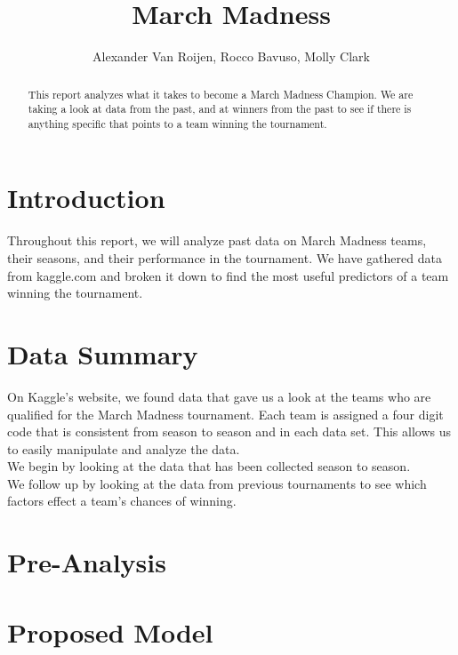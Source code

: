 \documentclass[]{scrartcl}
\title{March Madness}
\author{Alexander Van Roijen, Rocco Bavuso, Molly Clark}
\begin{document}
\maketitle

\begin{abstract}
This report analyzes what it takes to become a March Madness Champion. We are taking a look at data from the past, and at winners from the past to see if there is anything specific that points to a team winning the tournament.
\end{abstract}

\section*{Introduction}
Throughout this report, we will analyze past data on March Madness teams, their seasons, and their performance in the tournament. We have gathered data from kaggle.com and broken it down to find the most useful predictors of a team winning the tournament.
\section*{Data Summary}
On Kaggle's website, we found data that gave us a look at the teams who are qualified for the March Madness tournament. Each team is assigned a four digit code that is consistent from season to season and in each data set. This allows us to easily manipulate and analyze the data.\\

We begin by looking at the data that has been collected season to season.\\

We follow up by looking at the data from previous tournaments to see which factors effect a team's chances of winning.
\section*{Pre-Analysis}
\section*{Proposed Model}
\end{document}
